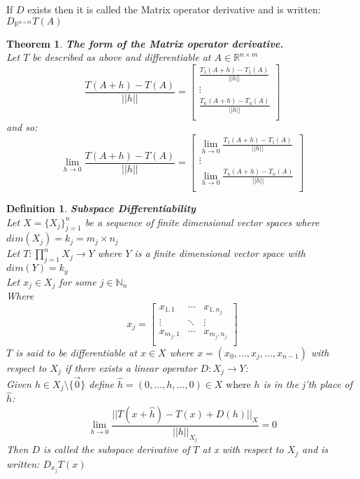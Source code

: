 \documentclass[12pt]{extarticle}
\theoremstyle{plain}
\newtheorem{thm}{Theorem}[section]
\theoremstyle{Definition}
\newtheorem{def.}{Definition}[section]
\theoremstyle{Definition}
\theoremstyle{plain}
\begin{document}
If $D$ exists then it is called the Matrix operator derivative and is written: $D_{\mathbb{R}^{n \times m}}T(A)$ \\ 
\begin{thm} \textbf{The form of the Matrix operator derivative.} \\ 
	Let $T$ be described as above and differentiable at $A \in \mathbb{R}^{n \times m}$ \\ 
	\[
	\frac{T(A + h) - T(A)}{||h||} = 
	\begin{bmatrix}
	\frac{T_1(A + h) - T_1(A)}{||h||} \\ 
	\vdots \\ 
	\frac{T_n(A + h) - T_n(A)}{||h||} \\ 	
	\end{bmatrix}
	\]
	and so: \\ 
	\[
	\lim_{h \to 0} \frac{T(A + h) - T(A)}{||h||} = 
	\begin{bmatrix}
	\lim_{h \to 0} \frac{T_1(A + h) - T_1(A)}{||h||} \\ 
	\vdots \\ 
	\lim_{h \to 0} \frac{T_n(A + h) - T_n(A)}{||h||} \\ 	
	\end{bmatrix}
	\]	
\end{thm}
\newpage
\begin{def.} \textbf{Subspace Differentiability} \\ 
	Let $X = \{X_j\}_{j=1}^{n}$ be a sequence of finite dimensional vector spaces where $dim(X_j) = k_j = m_j \times n_j$ \\ 
	Let $T : \prod_{j=1}^{n} X_j \to Y$ where $Y$ is a finite dimensional vector space with $dim(Y) = k_y$ \\ 
	Let $x_j \in X_j$ for some $j \in \mathbb{N}_n$ \\ 
	Where 
	\[
	x_j = 
	\begin{bmatrix}
	x_{1,1} & \cdots & x_{1,n_j} \\ 
	\vdots & \ddots & \vdots \\
	x_{m_j,1} & \cdots & x_{m_j,n_j} \\ 	
	\end{bmatrix}
	\]
	$T$ is said to be differentiable at $x \in X$ where $x = (x_0,...,x_j,...,x_{n-1})$ with respect to $X_j$ if there exists a linear operator $D : X_j \to Y$: \\ 
	Given $h \in X_j \setminus \{\vec{0}\}$ define $\hat{h} = (0,...,h,...,0) \in X \text{ where } h$ is in the j'th place of $\hat{h}$: \\
	$$\lim_{h \to 0} \frac{||T(x + \hat{h}) - T(x) + D(h)||_{X}}{||h||_{X_j}} = 0$$
	Then $D$ is called the subspace derivative of $T$ at x with respect to $X_j$ and is written: $D_{x_j} T(x)$ \\ 
\end{def.}
\end{document}
